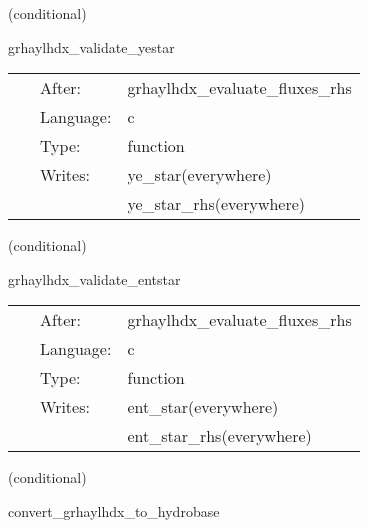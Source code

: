 \vspace{5mm}

   (conditional) 

\hspace{5mm} grhaylhdx\_validate\_yestar 

\hspace{5mm}{\it  } 


\hspace{5mm}

 \begin{tabular*}{160mm}{cll} 
~ & After:  & grhaylhdx\_evaluate\_fluxes\_rhs \\ 
~ & Language:  & c \\ 
~ & Type:  & function \\ 
~ & Writes:  & ye\_star(everywhere) \\ 
~& ~ &ye\_star\_rhs(everywhere)\\ 
\end{tabular*} 


\vspace{5mm}

   (conditional) 

\hspace{5mm} grhaylhdx\_validate\_entstar 

\hspace{5mm}{\it  } 


\hspace{5mm}

 \begin{tabular*}{160mm}{cll} 
~ & After:  & grhaylhdx\_evaluate\_fluxes\_rhs \\ 
~ & Language:  & c \\ 
~ & Type:  & function \\ 
~ & Writes:  & ent\_star(everywhere) \\ 
~& ~ &ent\_star\_rhs(everywhere)\\ 
\end{tabular*} 


\vspace{5mm}

   (conditional) 

\hspace{5mm} convert\_grhaylhdx\_to\_hydrobase 

\hspace{5mm}{\it convert grhaylhdx variables to hydrobasex } 


\hspace{5mm}

